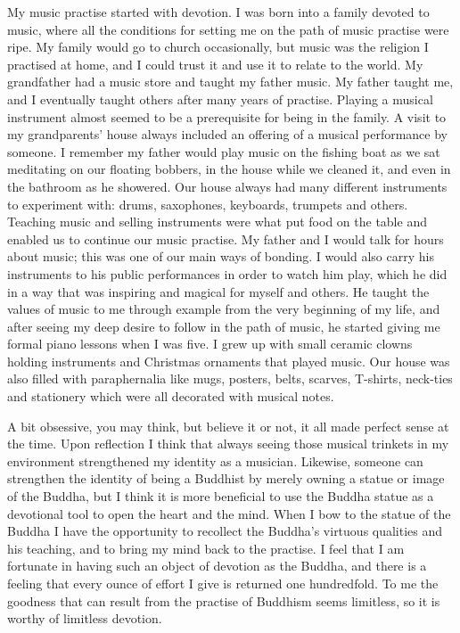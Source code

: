 My music practise started with devotion. I was born into a family
devoted to music, where all the conditions for setting me on the path of
music practise were ripe. My family would go to church occasionally, but
music was the religion I practised at home, and I could trust it and use
it to relate to the world. My grandfather had a music store and taught
my father music. My father taught me, and I eventually taught others
after many years of practise. Playing a musical instrument almost seemed
to be a prerequisite for being in the family. A visit to my
grandparents' house always included an offering of a musical performance
by someone. I remember my father would play music on the fishing boat as
we sat meditating on our floating bobbers, in the house while we cleaned
it, and even in the bathroom as he showered. Our house always had many
different instruments to experiment with: drums, saxophones, keyboards, 
trumpets and others. Teaching music and selling instruments were what
put food on the table and enabled us to continue our music practise. My
father and I would talk for hours about music; this was one of our main
ways of bonding. I would also carry his instruments to his public
performances in order to watch him play, which he did in a way that was
inspiring and magical for myself and others. He taught the values of
music to me through example from the very beginning of my life, and
after seeing my deep desire to follow in the path of music, he started
giving me formal piano lessons when I was five. I grew up with small
ceramic clowns holding instruments and Christmas ornaments that played
music. Our house was also filled with paraphernalia like mugs, posters, 
belts, scarves, T-shirts, neck-ties and stationery which were all
decorated with musical notes. 

A bit obsessive, you may think, but believe it or not, it all made
perfect sense at the time. Upon reflection I think that always seeing
those musical trinkets in my environment strengthened my identity as a
musician. Likewise, someone can strengthen the identity of being a
Buddhist by merely owning a statue or image of the Buddha, but I think
it is more beneficial to use the Buddha statue as a devotional tool to
open the heart and the mind. When I bow to the statue of the Buddha I
have the opportunity to recollect the Buddha's virtuous qualities and
his teaching, and to bring my mind back to the practise. I feel that I
am fortunate in having such an object of devotion as the Buddha, and
there is a feeling that every ounce of effort I give is returned one
hundredfold. To me the goodness that can result from the practise of
Buddhism seems limitless, so it is worthy of limitless devotion. 

